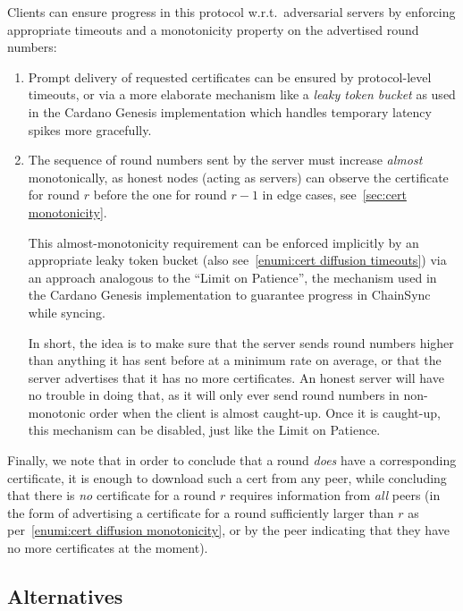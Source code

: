 Clients can ensure progress in this protocol w.r.t.\ adversarial servers by enforcing appropriate timeouts and a monotonicity property on the advertised round numbers:
\begin{enumerate}
\item\label{enumi:cert diffusion timeouts}
  Prompt delivery of requested certificates can be ensured by protocol-level timeouts, or via a more elaborate mechanism like a \emph{leaky token bucket} as used in the Cardano Genesis implementation  \parencite{genesis-implementation-documentation} which handles temporary latency spikes more gracefully.
\item\label{enumi:cert diffusion monotonicity}
  The sequence of round numbers sent by the server must increase \emph{almost} monotonically, as honest nodes (acting as servers) can observe the certificate for round $r$ before the one for round $r-1$ in edge cases, see~\cref{sec:cert monotonicity}.

  This almost-monotonicity requirement can be enforced implicitly by an appropriate leaky token bucket (also see~\ref{enumi:cert diffusion timeouts}) via an approach analogous to the \enquote{Limit on Patience}, the mechanism used in the Cardano Genesis implementation \parencite{genesis-implementation-documentation} to guarantee progress in ChainSync while syncing.

  In short, the idea is to make sure that the server sends round numbers higher than anything it has sent before at a minimum rate on average, or that the server advertises that it has no more certificates.
  An honest server will have no trouble in doing that, as it will only ever send round numbers in non-monotonic order when the client is almost caught-up.
  Once it is caught-up, this mechanism can be disabled, just like the Limit on Patience.
\end{enumerate}

Finally, we note that in order to conclude that a round \emph{does} have a corresponding certificate, it is enough to download such a cert from any peer, while concluding that there is \emph{no} certificate for a round $r$ requires information from \emph{all} peers (in the form of advertising a certificate for a round sufficiently larger than $r$ as per~\ref{enumi:cert diffusion monotonicity}, or by the peer indicating that they have no more certificates at the moment).

\subsection{Alternatives}\label{sec:vote cert alternatives}

